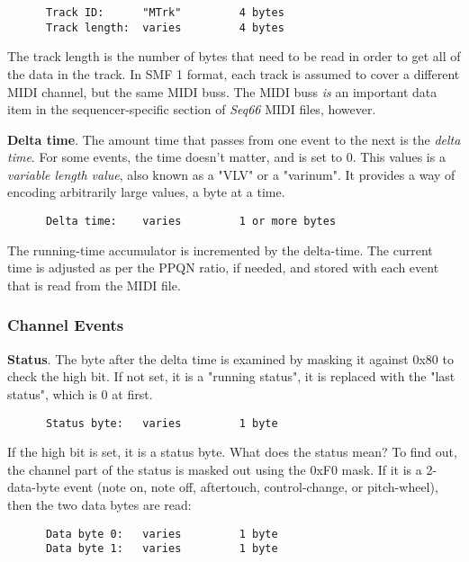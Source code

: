    \begin{verbatim}
      Track ID:      "MTrk"         4 bytes
      Track length:  varies         4 bytes
   \end{verbatim}

   The track length is the number of bytes that need to be read in order to get
   all of the data in the track.
   In SMF 1 format, each track is assumed to cover a different MIDI channel,
   but the same MIDI buss.
   The MIDI buss \textsl{is} an important data item in the sequencer-specific
   section of \textsl{Seq66} MIDI files, however.

   \textbf{Delta time}.
   The amount time that passes from one event to the next is the
   \textsl{delta time}.
   For some events, the time doesn't matter, and is set to 0.
   This values is a
   \textsl{variable length value}, also known as a "VLV" or a "varinum".   It
   provides a way of encoding arbitrarily large values, a byte at a time.

   \begin{verbatim}
      Delta time:    varies         1 or more bytes
   \end{verbatim}

   The running-time accumulator is incremented by the delta-time.
   The current time is adjusted as per the PPQN ratio, if needed, and stored with
   each event that is read from the MIDI file.

\subsubsection{Channel Events}
\label{subsubsec:midi_format_channel_events}

   \textbf{Status}.
   The byte after the delta time is examined by masking it against 0x80 to check
   the high bit.  If not set, it is a "running status", it is replaced with the
   "last status", which is 0 at first.

   \begin{verbatim}
      Status byte:   varies         1 byte
   \end{verbatim}

   If the high bit is set, it is a status byte.  What does the status mean?  To
   find out, the channel part of the status is masked out using the 0xF0 mask.
   If it is a 2-data-byte event (note on, note off, aftertouch, control-change,
   or pitch-wheel), then the two data bytes are read:

   \begin{verbatim}
      Data byte 0:   varies         1 byte
      Data byte 1:   varies         1 byte
   \end{verbatim}

